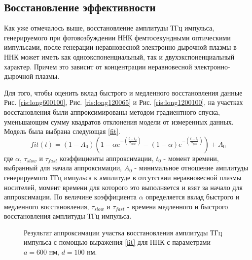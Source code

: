 \documentclass[a4paper,14pt,russian]{extreport}
\begin{document}
			\subsection{Восстановление эффективности}\label{paragraph:Recovery}
				Как уже отмечалось выше, восстановление амплитуды ТГц импульса, генерируемого при фотовозбуждении ННК фемтосекундными оптическими импульсами, после генерации неравновесной электронно дырочной плазмы в ННК может иметь как одноэкспоненциальный, так и двухэкспоненциальный характер. Причем это зависит от концентрации неравновесной электронно-дырочной плазмы.\par
				Для того, чтобы оценить вклад быстрого и медленного восстановления данные Рис. \ref{ris:long600100}, Рис. \ref{ris:long120065} и Рис. \ref{ris:long1200100}, на участках восстановления были аппроксимированы методом градиентного спуска, уменьшающим сумму квадратов отклонения модели от измеренных данных. Модель была выбрана следующая \ref{fit}.
				\begin{equation}\label{fit}
					fit(t) = (1-A_0)\left(1-\alpha e^{- \left(\frac{t - t_o}{\tau_{slow}}\right)} - (1-\alpha)e^{- \left(\frac{t - t_o}{\tau_{fast}}\right)}\right) + A_0
				\end{equation}
					где $\alpha$, $\tau_{slow}$ и $\tau_{fast}$ коэффициенты аппроксимации, $t_0$ - момент времени, выбранный для начала аппроксимации, $A_0$ - минимальное отношение амплитуды генерируемого ТГц импульса к амплитуде в отсутствии неравновесной плазмы носителей, момент времени для которого это выполняется и взят за начало для аппроксимации. По величине коэффициента $\alpha$ определяется вклад быстрого и медленного восстановления, $\tau_{slow}$ и $\tau_{fast}$ - времена медленного и быстрого восстановления амплитуды ТГц импульса.\par
				\begin{figure}[h]
					\caption{Результат аппроксимации участка восстановления амплитуды ТГц импульса с помощью выражения \ref{fit} для ННК с параметрами $a = 600 \text{ нм, } d = 100 \text{ нм}$.}
				\label{ris:LongAproximation600100}
				\end{figure}
\end{document}
